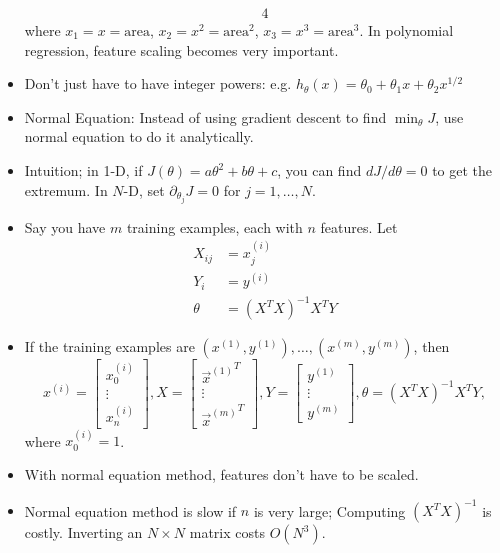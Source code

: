 \documentclass[10pt]{article}
\begin{document}
\begin{itemize}
\begin{alignat*}{4}
    \end{alignat*}
    where $x_1=x=\text{area}$, $x_2=x^2 = \text{area}^2$, $x_3=x^3=\text{area}^3$. In polynomial regression, feature scaling becomes very important.
  \item Don't just have to have integer powers: e.g. $h_{\theta}(x) = \theta_0 + \theta_1x + \theta_2 x^{1/2}$
  \item Normal Equation: Instead of using gradient descent to find $\min_{\theta}J$, use normal equation to do it analytically.
  \item Intuition; in 1-D, if $J(\theta)=a\theta^2 + b\theta+c$, you can find $dJ/d\theta=0$ to get the extremum. In $N$-D, set $\partial_{\theta_j}J=0$ for $j=1,\dots,N$.
  \item Say you have $m$ training examples, each with $n$ features. Let
    \begin{align*}
      X_{ij} &= x_j^{(i)} \\
      Y_i &= y^{(i)} \\
      \theta &= \left( X^T X \right)^{-1} X^T Y
    \end{align*}
  \item If the training examples are $\left( x^{(1)}, y^{(1)} \right), \dots, \left( x^{(m)}, y^{(m)} \right)$, then
    \begin{equation*}
      x^{(i)} = \begin{bmatrix}x_0^{(i)} \\ \vdots \\ x_n^{(i)}\end{bmatrix}, 
      X = \begin{bmatrix} \left.\vec{x}^{(1)}\right.^T \\ \vdots \\ \left.\vec{x}^{(m)}\right.^T \end{bmatrix},
      Y = \begin{bmatrix} y^{(1)} \\ \vdots \\ y^{(m)} \end{bmatrix},
      \theta = \left( X^T X\right)^{-1} X^T Y,
    \end{equation*}
    where $x_0^{(i)}=1$.
  \item With normal equation method, features don't have to be scaled.
  \item Normal equation method is slow if $n$ is very large; Computing $(X^TX)^{-1}$ is costly. Inverting an $N \times N$ matrix costs $O(N^3)$.
\end{itemize}
\hfill \\
\end{document}
